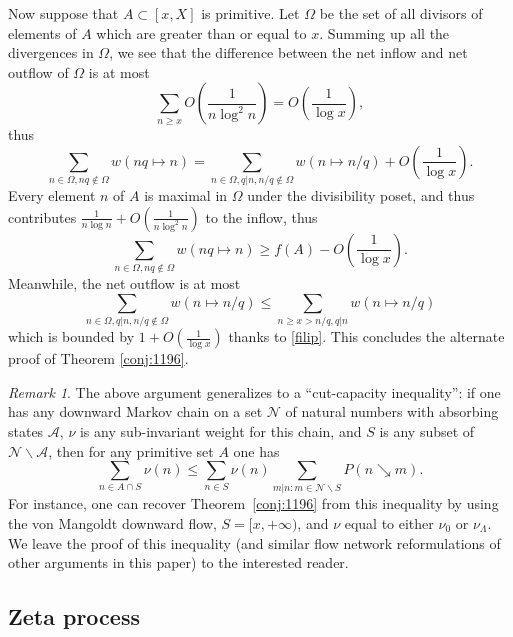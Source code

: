 \documentclass[12pt]{amsart}
\theoremstyle{definition}
\theoremstyle{remark}
\newtheorem{remark}[theorem]{Remark}
\numberwithin{equation}{section}
\newcommand{\nuMangoldt}{\nu_{\Lambda}}
\newcommand{\1}{{\mathbf 1}}
\begin{document}
Now suppose that $A \subset [x,X]$ is primitive.  Let $\Omega$ be the set of all divisors of elements of $A$ which are greater than or equal to $x$.  Summing up all the divergences in $\Omega$, we see that the difference between the net inflow and net outflow of $\Omega$ is at most
$$ \sum_{n \geq x} O\left(\frac{1}{n \log^2 n}\right) = O\left(\frac{1}{\log x}\right),$$
thus
$$ \sum_{n \in \Omega, nq \notin \Omega} w(nq \mapsto n) = \sum_{n \in \Omega, q|n, n/q \notin \Omega} w(n \mapsto n/q) + O\left(\frac{1}{\log x}\right).$$
Every element $n$ of $A$ is maximal in $\Omega$ under the divisibility poset, and thus contributes $\frac{1}{n \log n} + O\left(\frac{1}{n \log^2 n}\right)$ to the inflow, thus
$$ \sum_{n \in \Omega, nq \notin \Omega} w(nq \mapsto n)  \geq f(A) -  O\left(\frac{1}{\log x}\right).$$
Meanwhile, the net outflow is at most
$$\sum_{n \in \Omega, q|n, n/q \notin \Omega} w(n \mapsto n/q) \leq \sum_{n \geq x > n/q, q|n} w(n \mapsto n/q)$$
which is bounded by $1 + O\left(\frac{1}{\log x}\right)$ thanks to \eqref{filip}.  This concludes the alternate proof of Theorem \ref{conj:1196}.  

\begin{remark}\label{gpt-rem-5} The above argument generalizes to a ``cut-capacity inequality'': if one has any downward Markov chain on a set ${\mathcal N}$ of natural numbers with absorbing states ${\mathcal A}$, $\nu$ is any sub-invariant weight for this chain, and $S$ is any subset of ${\mathcal N} \backslash {\mathcal A}$, then for any primitive set $A$ one has
$$ \sum_{n \in A \cap S} \nu(n) \leq \sum_{n \in S} \nu(n) \sum_{m|n: m \in {\mathcal N} \backslash S} P(n \searrow m).$$
For instance, one can recover Theorem~\ref{conj:1196} from this inequality by using the von Mangoldt downward flow, $S = [x,+\infty)$, and $\nu$ equal to either $\nu_0$ or $\nuMangoldt$.  We leave the proof of this inequality (and similar flow network reformulations of other arguments in this paper) to the interested reader.
\end{remark}

\subsection{Zeta process} \label{subsection:zeta}
\end{document}

